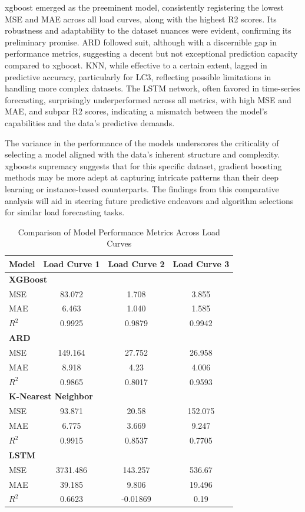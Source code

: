 \documentclass{article} %
\begin{document}
\gls{xgboost} emerged as the preeminent model, consistently registering the lowest \gls{MSE} and \gls{MAE} across all load curves, along with the highest \gls{R2} scores. Its robustness and adaptability to the dataset nuances were evident, confirming its preliminary promise. \gls{ARD} followed suit, although with a discernible gap in performance metrics, suggesting a decent but not exceptional prediction capacity compared to \gls{xgboost}. \gls{KNN}, while effective to a certain extent, lagged in predictive accuracy, particularly for \gls{LC3}, reflecting possible limitations in handling more complex datasets. The \gls{LSTM} network, often favored in time-series forecasting, surprisingly underperformed across all metrics, with high \gls{MSE} and \gls{MAE}, and subpar \gls{R2} scores, indicating a mismatch between the model's capabilities and the data's predictive demands.

The variance in the performance of the models underscores the criticality of selecting a model aligned with the data's inherent structure and complexity. \glspl{xgboost} supremacy suggests that for this specific dataset, gradient boosting methods may be more adept at capturing intricate patterns than their deep learning or instance-based counterparts. The findings from this comparative analysis will aid in steering future predictive endeavors and algorithm selections for similar load forecasting tasks.
\begin{table}[h]
\centering
\caption{Comparison of Model Performance Metrics Across Load Curves}
\label{tab:model_performance}
\begin{tabular}{@{\hspace{1em}}lccc}
\toprule
\textbf{Model} & \textbf{Load Curve 1} & \textbf{Load Curve 2} & \textbf{Load Curve 3} \\
\midrule
\multicolumn{4}{l}{\textbf{XGBoost}} \\
\midrule
MSE & 83.072 & 1.708 & 3.855 \\
MAE & 6.463 & 1.040 & 1.585 \\
$R^2$ & 0.9925 & 0.9879 & 0.9942 \\
\midrule
\multicolumn{4}{l}{\textbf{ARD}} \\
\midrule
MSE & 149.164 & 27.752 & 26.958 \\
MAE & 8.918 & 4.23 & 4.006 \\
$R^2$ & 0.9865 & 0.8017 & 0.9593 \\
\midrule
\multicolumn{4}{l}{\textbf{K-Nearest Neighbor}} \\
\midrule
MSE & 93.871 & 20.58 & 152.075 \\
MAE & 6.775 & 3.669 & 9.247 \\
$R^2$ & 0.9915 & 0.8537 & 0.7705 \\
\midrule
\multicolumn{4}{l}{\textbf{LSTM}} \\
\midrule
MSE & 3731.486 & 143.257 & 536.67 \\
MAE & 39.185 & 9.806 & 19.496 \\
$R^2$ & 0.6623 & -0.01869 & 0.19 \\
\bottomrule
\end{tabular}
\end{table}
\end{document}
